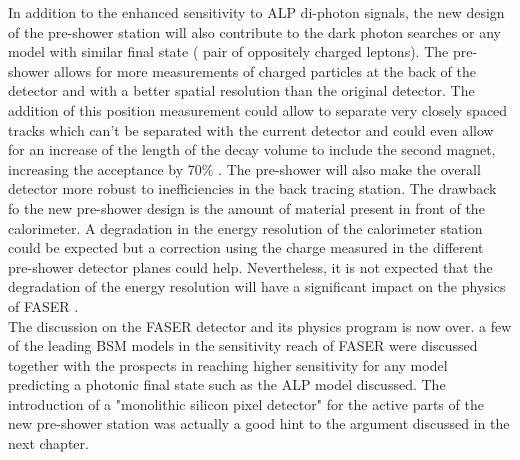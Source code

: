 		In addition to the enhanced sensitivity to ALP di-photon signals, the new design of the pre-shower station will also contribute to the dark photon searches or any model with similar final state ( pair of oppositely charged leptons). The pre-shower allows for more measurements of charged particles at the back of the detector and with a better spatial resolution than the original detector. The addition of this position measurement could allow to separate very closely spaced tracks which can't be separated with the current detector and could even allow for an increase of the length of the decay volume to include the second magnet, increasing the acceptance by 70$\%$ \cite{PreShower_TP}. The pre-shower will also make the overall detector more robust to inefficiencies in the back tracing station. 
		The drawback fo the new pre-shower design is the amount of material present in front of the calorimeter. A degradation in the energy resolution of the calorimeter station could be expected but a correction using the charge measured in the different pre-shower detector planes could help. Nevertheless, it is not expected that the degradation of the energy resolution will have a significant impact on the physics of FASER \cite{PreShower_TP}.\\
		
		The discussion on the FASER detector and its physics program is now over. a few of the leading BSM models in the sensitivity reach of FASER were discussed together with the prospects in reaching higher sensitivity for any model predicting a photonic final state such as the ALP model discussed. The introduction of a "monolithic silicon pixel detector" for the active parts of the new pre-shower station was actually a good hint to the argument discussed in the next chapter. 
		


		
		
		
		
		
		
		
		
		
		
		
		
		
		
		
		
		
		